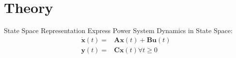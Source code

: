 \section[Theory]{Theory}
\label{sec:lasso_theory}

\begin{frame}[fragile]{State Space Representation}
	Express Power System Dynamics in State Space:
	\begin{equation}
		\label{eq:ssr}
		\begin{align}
			\dot{\textbf{x}}(t) = 
			& \textbf{A}\textbf{x}(t)
			+ \textbf{B}\textbf{u}(t)\\
			\textbf{y}(t) = 
			& \textbf{C}\textbf{x}(t)  
			\forall t\geq0
		\end{align}
	\end{equation}
\end{frame}